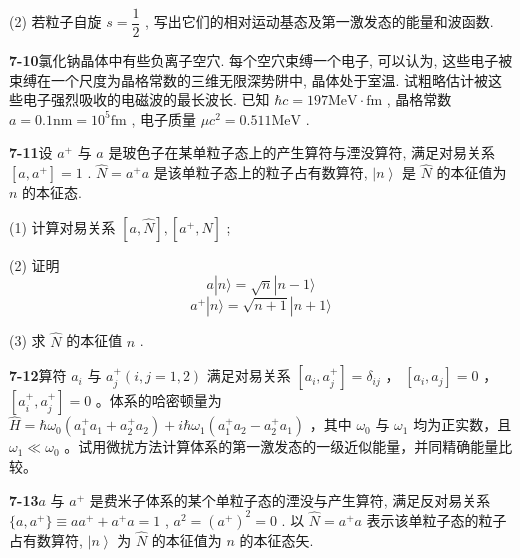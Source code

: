 (2) 若粒子自旋 $\displaystyle s = \dfrac{1}{2}$ , 写出它们的相对运动基态及第一激发态的能量和波函数.

\vfill

\newpage

\textbf{7-10}\quad 氯化钠晶体中有些负离子空穴. 每个空穴束缚一个电子, 可以认为, 这些电子被束缚在一个尺度为晶格常数的三维无限深势阱中, 晶体处于室温. 试粗略估计被这些电子强烈吸收的电磁波的最长波长. 已知 $\displaystyle \hbar c = 197\mathrm{MeV}\cdot \mathrm{fm}$ , 晶格常数 $\displaystyle a = 0.1\mathrm{nm} = 10^{5}\mathrm{fm}$ , 电子质量 $\displaystyle \mu c^2 = 0.511\mathrm{MeV}$ .

\vfill

\newpage

\textbf{7-11}\quad 设 $\displaystyle a^+$ 与 $\displaystyle a$ 是玻色子在某单粒子态上的产生算符与湮没算符, 满足对易关系 $\displaystyle [a, a^+] = 1$ . $\displaystyle \hat{N} = a^+ a$ 是该单粒子态上的粒子占有数算符, $\displaystyle \left|n\right\rangle$ 是 $\displaystyle \hat{N}$ 的本征值为 $\displaystyle n$ 的本征态.

(1) 计算对易关系 $\displaystyle [a, \hat{N}], [a^+, \hat{N}]$ ;

(2) 证明
\begin{equation}\tag{1}
    a | n \rangle = \sqrt {n} | n - 1 \rangle
\end{equation}
\begin{equation}\tag{2}
    a ^ {+} | n \rangle = \sqrt {n + 1} | n + 1 \rangle
\end{equation}

(3) 求 $\displaystyle \hat{N}$ 的本征值 $\displaystyle n$ .

\vfill

\newpage

\textbf{7-12}\quad 算符 $\displaystyle a_{i}$ 与 $\displaystyle a_{j}^{+}(i,j = 1,2)$ 满足对易关系 $\displaystyle [a_i,a_j^+] = \delta_{ij}$ ， $\displaystyle [a_i,a_j] = 0$ ， $\displaystyle [a_i^+, a_j^+] = 0$ 。体系的哈密顿量为 $\displaystyle \hat{H} = \hbar \omega_0(a_1^+ a_1 + a_2^+ a_2) + i\hbar \omega_1(a_1^+ a_2 - a_2^+ a_1)$ ，其中 $\displaystyle \omega_0$ 与 $\displaystyle \omega_1$ 均为正实数，且 $\displaystyle \omega_1 \ll \omega_0$ 。试用微扰方法计算体系的第一激发态的一级近似能量，并同精确能量比较。

\vfill

\newpage

\textbf{7-13}\quad $\displaystyle a$ 与 $\displaystyle a^{+}$ 是费米子体系的某个单粒子态的湮没与产生算符, 满足反对易关系 $\displaystyle \{a, a^{+}\} \equiv aa^{+} + a^{+}a = 1$ , $\displaystyle a^{2} = (a^{+})^{2} = 0$ . 以 $\displaystyle \hat{N} = a^{+}a$ 表示该单粒子态的粒子占有数算符, $\displaystyle \left|n\right\rangle$ 为 $\displaystyle \hat{N}$ 的本征值为 $\displaystyle n$ 的本征态矢.

